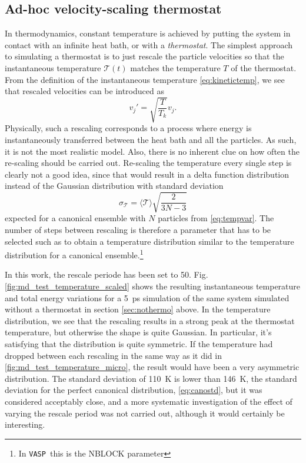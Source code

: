 \documentclass[11pt,bibliography=totoc,index=totoc]{scrbook}   %
\newcommand{\vasp}{{\texttt{VASP}}} %
\begin{document}
%
\subsection{Ad-hoc velocity-scaling thermostat}\label{sec:velocity-scaling}
%

In thermodynamics, constant temperature is achieved by putting the system in contact with an infinite heat bath, or with a \emph{thermostat}.
The simplest approach to simulating a thermostat is to just rescale the particle velocities so that the instantaneous temperature $\mathcal{T}(t)$ matches the temperature $T$ of the thermostat. 
From the definition of the instantaneous temperature \eqref{eq:kinetictemp}, we see that rescaled velocities can be introduced as
\begin{equation}
    v_j' = \sqrt{\frac{T}{T_k}} v_j.
\end{equation}
Physically, such a rescaling corresponds to a process where energy is instantaneously transferred between the heat bath and all the particles. 
As such, it is not the most realistic model. 
Also, there is no inherent clue on how often the re-scaling should be carried out. 
Re-scaling the temperature every single step is clearly not a good idea, since that would result in a delta function distribution instead of the Gaussian distribution with standard deviation
\begin{equation}
    \sigma_{\mathcal{T}} = \langle \mathcal{T} \rangle \sqrt{\frac{2}{3N-3}}
  \label{eq:canostd}
\end{equation}
expected for a canonical ensemble with $N$ particles from \eqref{eq:tempvar}.
The number of steps between rescaling is therefore a parameter that has to be selected such as to obtain a temperature distribution similar to the temperature distribution for a canonical ensemble.\footnote{In \vasp\ this is the NBLOCK parameter}

In this work, the rescale periode has been set to 50.
Fig. \ref{fig:md_test_temperature_scaled} shows the resulting instantaneous temperature and total energy variations for a 5~ps simulation of the same system simulated without a thermostat in section \ref{sec:nothermo} above.
In the temperature distribution, we see that the rescaling results in a strong peak at the thermostat temperature,
but otherwise the shape is quite Gaussian. 
In particular, it's satisfying that the distribution is quite symmetric. 
If the temperature had dropped between each rescaling in the same way as it did in \ref{fig:md_test_temperature_micro},
the result would have been a very asymmetric distribution.
The standard deviation of 110~K is lower than 146~K, the standard deviation for the perfect canonical distribution, \eqref{eq:canostd},
but it was considered acceptably close, and a more systematic investigation of the effect of 
varying the rescale period was not carried out, although it would certainly be interesting.
\end{document}
